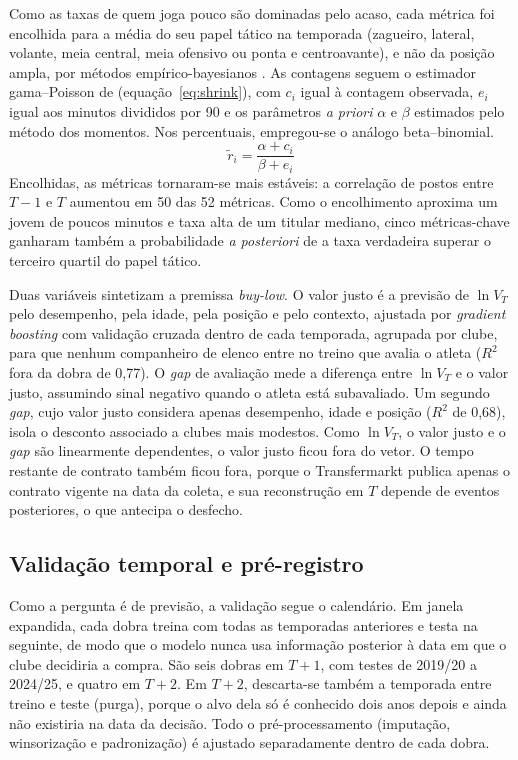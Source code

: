 \documentclass[article, 12pt, oneside, a4paper, english, brazil, section=TITLE]{abntex2}
\begin{document}
Como as taxas de quem joga pouco são dominadas pelo acaso, cada métrica foi encolhida para a média do seu papel tático na temporada (zagueiro, lateral, volante, meia central, meia ofensivo ou ponta e centroavante), e não da posição ampla, por métodos empírico-bayesianos \cite{efron1975}.
As contagens seguem o estimador gama–Poisson de \textcite{clayton1987} (equação~\eqref{eq:shrink}), com $c_i$ igual à contagem observada, $e_i$ igual aos minutos divididos por 90 e os parâmetros \textit{a priori} $\alpha$ e $\beta$ estimados pelo método dos momentos.
Nos percentuais, empregou-se o análogo beta–binomial.
\begin{equation}
  \tilde{r}_i = \frac{\alpha + c_i}{\beta + e_i}
  \label{eq:shrink}
\end{equation}
Encolhidas, as métricas tornaram-se mais estáveis: a correlação de postos entre $T-1$ e $T$ aumentou em 50 das 52 métricas.
Como o encolhimento aproxima um jovem de poucos minutos e taxa alta de um titular mediano, cinco métricas-chave ganharam também a probabilidade \textit{a posteriori} de a taxa verdadeira superar o terceiro quartil do papel tático.

Duas variáveis sintetizam a premissa \textit{buy-low}.
O valor justo é a previsão de $\ln V_T$ pelo desempenho, pela idade, pela posição e pelo contexto, ajustada por \textit{gradient boosting} com validação cruzada dentro de cada temporada, agrupada por clube, para que nenhum companheiro de elenco entre no treino que avalia o atleta ($R^2$ fora da dobra de 0,77).
O \textit{gap} de avaliação mede a diferença entre $\ln V_T$ e o valor justo, assumindo sinal negativo quando o atleta está subavaliado.
Um segundo \textit{gap}, cujo valor justo considera apenas desempenho, idade e posição ($R^2$ de 0,68), isola o desconto associado a clubes mais modestos.
Como $\ln V_T$, o valor justo e o \textit{gap} são linearmente dependentes, o valor justo ficou fora do vetor.
O tempo restante de contrato também ficou fora, porque o Transfermarkt publica apenas o contrato vigente na data da coleta, e sua reconstrução em $T$ depende de eventos posteriores, o que antecipa o desfecho.

\subsection{Validação temporal e pré-registro}

Como a pergunta é de previsão, a validação segue o calendário.
Em janela expandida, cada dobra treina com todas as temporadas anteriores e testa na seguinte, de modo que o modelo nunca usa informação posterior à data em que o clube decidiria a compra.
São seis dobras em $T+1$, com testes de 2019/20 a 2024/25, e quatro em $T+2$.
Em $T+2$, descarta-se também a temporada entre treino e teste (purga), porque o alvo dela só é conhecido dois anos depois e ainda não existiria na data da decisão.
Todo o pré-processamento (imputação, winsorização e padronização) é ajustado separadamente dentro de cada dobra.
\end{document}
